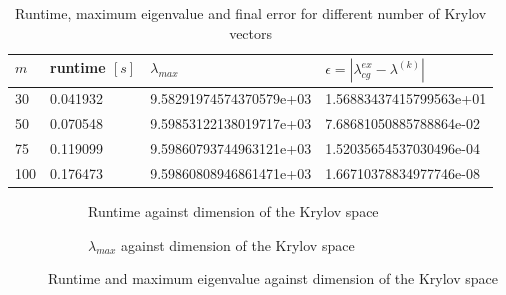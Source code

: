 \documentclass[11pt,a4paper]{article}
\begin{document}
\newpage
\renewcommand{\arraystretch}{2}
\begin{table}[h!]
	\begin{center}
		\begin{tabular}{ p{2cm} p{2cm} p{5cm} p{5cm}}
			\hline
			\hline
			$m$ & runtime $[s]$ & $\lambda_{max}$ & $\epsilon = |\lambda_{cg}^{ex} - \lambda^{(k)}|$ \\
			\hline
			\hline
			30 & 0.041932  & 9.58291974574370579e+03 & 1.56883437415799563e+01\\
			\hline
			50 & 0.070548  & 9.59853122138019717e+03 & 7.68681050885788864e-02\\
			\hline
			75 & 0.119099  & 9.59860793744963121e+03 & 1.52035654537030496e-04\\
			\hline
			100 & 0.176473   & 9.59860808946861471e+03  & 1.66710378834977746e-08\\
			\hline
			\hline
		\end{tabular}
		\caption{\label{tab:Lanc}  Runtime, maximum eigenvalue and final error for different number of Krylov vectors}
	\end{center}
\end{table}
\renewcommand{\arraystretch}{1}

\begin{figure}[h!]
	\centering
	\begin{subfigure}[h!]{.49\textwidth}
		\begin{center}
			\resizebox{0.52\width}{!}{}
			\caption{Runtime against dimension of the Krylov space}
			\label{fig::Lanc1}
		\end{center}	
	\end{subfigure}
	\hfill
	\begin{subfigure}[h!]{.49\textwidth}
		\centering
		\resizebox{0.52\width}{!}{}
		\caption{$\lambda_{max}$ against dimension of the Krylov space}
		\label{fig::Lanc2}
	\end{subfigure}
	\caption{Runtime and maximum eigenvalue against dimension of the Krylov space}
	\label{fig::Lanc}
\end{figure}
\end{document}
